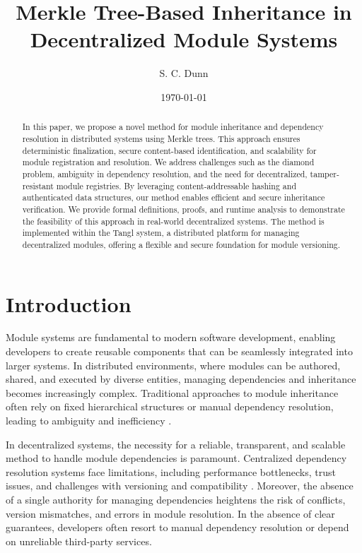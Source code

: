 \documentclass[sigplan,screen]{acmart}
\title{Merkle Tree-Based Inheritance in Decentralized Module Systems}
\author{S. C. Dunn}
\affiliation{%
  \institution{Starlabs, LLC}
  \city{Colorado Springs}
  \state{CO}
  \country{USA}}
\date{\today}
\begin{document}
\begin{abstract}
In this paper, we propose a novel method for module inheritance and dependency resolution in distributed systems using Merkle trees. This approach ensures deterministic finalization, secure content-based identification, and scalability for module registration and resolution. We address challenges such as the diamond problem, ambiguity in dependency resolution, and the need for decentralized, tamper-resistant module registries. By leveraging content-addressable hashing and authenticated data structures, our method enables efficient and secure inheritance verification. We provide formal definitions, proofs, and runtime analysis to demonstrate the feasibility of this approach in real-world decentralized systems. The method is implemented within the Tangl system, a distributed platform for managing decentralized modules, offering a flexible and secure foundation for module versioning.
\vfill
\end{abstract}

\maketitle

\section{Introduction}

Module systems are fundamental to modern software development, enabling developers to create reusable components that can be seamlessly integrated into larger systems. In distributed environments, where modules can be authored, shared, and executed by diverse entities, managing dependencies and inheritance becomes increasingly complex. Traditional approaches to module inheritance often rely on fixed hierarchical structures or manual dependency resolution, leading to ambiguity and inefficiency \cite{cardelli1996}.

In decentralized systems, the necessity for a reliable, transparent, and scalable method to handle module dependencies is paramount. Centralized dependency resolution systems face limitations, including performance bottlenecks, trust issues, and challenges with versioning and compatibility \cite{decan2017}. Moreover, the absence of a single authority for managing dependencies heightens the risk of conflicts, version mismatches, and errors in module resolution. In the absence of clear guarantees, developers often resort to manual dependency resolution or depend on unreliable third-party services.
\end{document}
